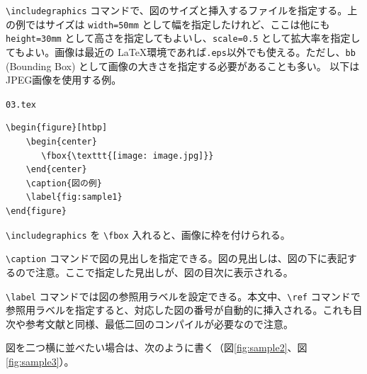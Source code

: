 \verb|\includegraphics| コマンドで、図のサイズと挿入するファイルを指定する。上の例ではサイズは {\tt width=50mm} として幅を指定したけれど、ここは他にも {\tt height=30mm} として高さを指定してもよいし、{\tt scale=0.5} として拡大率を指定してもよい。画像は最近の \LaTeX 環境であれば{\tt *.eps}以外でも使える。ただし、{\tt bb} (Bounding Box) として画像の大きさを指定する必要があることも多い。
以下はJPEG画像を使用する例。

\begin{itembox}[l]{{\tt 03.tex}}
\begin{verbatim}
\begin{figure}[htbp]
    \begin{center}
       \fbox{\texttt{[image: image.jpg]}}
    \end{center}
    \caption{図の例}
    \label{fig:sample1}
\end{figure}
\end{verbatim}
\end{itembox}


\verb|\includegraphics| を \verb|\fbox| 入れると、画像に枠を付けられる。

\verb|\caption| コマンドで図の見出しを指定できる。図の見出しは、図の下に表記するので注意。ここで指定した見出しが、図の目次に表示される。

\verb|\label| コマンドでは図の参照用ラベルを設定できる。本文中、\verb|\ref| コマンドで参照用ラベルを指定すると、対応した図の番号が自動的に挿入される。これも目次や参考文献と同様、最低二回のコンパイルが必要なので注意。

図を二つ横に並べたい場合は、次のように書く（図\ref{fig:sample2}、図\ref{fig:sample3}）。

